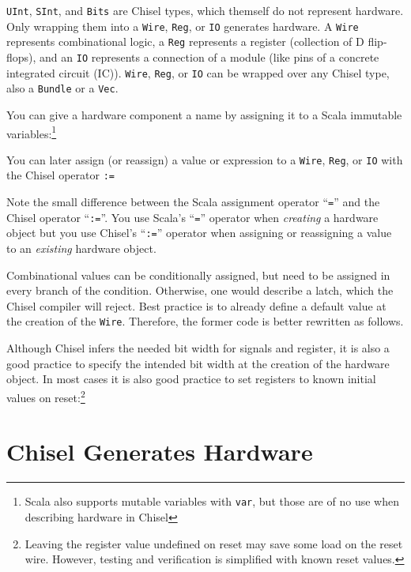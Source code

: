 \documentclass[%
    10pt,
    headinclude, footexclude,
    openright, %
    notitlepage,
    cleardoubleempty,
    headsepline,
    pointlessnumbers,
    bibtotoc, idxtotoc,
    ]{scrbook}
\newcommand{\code}[1]{{\small{\texttt{#1}}}}
\newcommand{\codefoot}[1]{{\footnotesize{\texttt{#1}}}}
\begin{document}
\code{UInt}, \code{SInt}, and \code{Bits} are Chisel types, which themself do not
represent hardware. Only wrapping them into a \code{Wire}, \code{Reg}, or \code{IO}
generates hardware. A \code{Wire} represents combinational logic, a \code{Reg}
represents a register (collection of D flip-flops), and an \code{IO} represents a
connection of a module (like pins of a concrete integrated circuit (IC)).
\code{Wire}, \code{Reg}, or \code{IO} can be wrapped over any Chisel type, also
a \code{Bundle} or a \code{Vec}.

You can give a hardware component a name by assigning it to a Scala immutable
variables:\footnote{Scala also supports mutable variables with \codefoot{var}, but those are of no use
when describing hardware in Chisel}


\noindent You can later assign (or reassign) a value or expression to a \code{Wire}, \code{Reg}, or \code{IO}
with the Chisel operator \code{:=}


\noindent Note the small difference between the Scala assignment operator ``\code{=}''
and the Chisel operator ``\code{:=}''. You use Scala's ``\code{=}'' operator when \emph{creating} a hardware
object but you use Chisel's ``\code{:=}'' operator when assigning or reassigning a value to
an \emph{existing} hardware object.

Combinational values can be conditionally assigned, but need to be assigned in every branch
of the condition. Otherwise, one would describe a latch, which the Chisel compiler will reject.
Best practice is to already define a default value at the creation of the \code{Wire}.
Therefore, the former code is better rewritten as follows.


\noindent Although Chisel infers the needed bit width for signals and register, it is also a good practice
to specify the intended bit width at the creation of the hardware object.
In most cases it is also good practice to set registers to known initial values on
reset:\footnote{Leaving the register value undefined on reset may save some load on the reset
wire. However, testing and verification is simplified with known reset values.}


\section{Chisel Generates Hardware}
\end{document}

